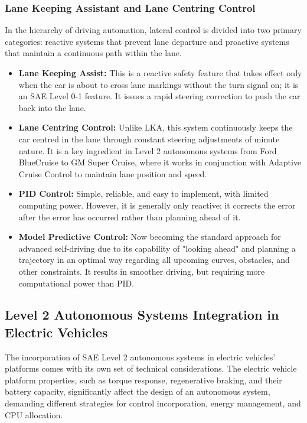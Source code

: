 \documentclass[12pt, a4paper]{report}
\begin{document}
\subsubsection{Lane Keeping Assistant and Lane Centring Control}

In the hierarchy of driving automation, lateral control is divided into two primary categories: reactive systems that prevent lane departure and proactive systems that maintain a continuous path within the lane.

\begin{itemize}
    \item \textbf{Lane Keeping Assist:} This is a reactive safety feature that takes effect only when the car is about to cross lane markings without the turn signal on; it is an SAE Level 0-1 feature. It issues a rapid steering correction to push the car back into the lane.
    \item \textbf{Lane Centring Control:} Unlike LKA, this system continuously keeps the car centred in the lane through constant steering adjustments of minute nature. It is a key ingredient in Level 2 autonomous systems from Ford BlueCruise to GM Super Cruise, where it works in conjunction with Adaptive Cruise Control to maintain lane position and speed.
    \item \textbf{PID Control:} Simple, reliable, and easy to implement, with limited computing power. However, it is generally only reactive; it corrects the error after the error has occurred rather than planning ahead of it.
    \item \textbf{Model Predictive Control:} Now becoming the standard approach for advanced self-driving due to its capability of "looking ahead" and planning a trajectory in an optimal way regarding all upcoming curves, obstacles, and other constraints. It results in smoother driving, but requiring more computational power than PID. \cite{ref8, ref9, ref22}
\end{itemize}

\subsection{Level 2 Autonomous Systems Integration in Electric Vehicles}

The incorporation of SAE Level 2 autonomous systems in electric vehicles' platforms comes with its own set of technical considerations. The electric vehicle platform properties, such as torque response, regenerative braking, and their battery capacity, significantly affect the design of an autonomous system, demanding different strategies for control incorporation, energy management, and CPU allocation.
\end{document}
